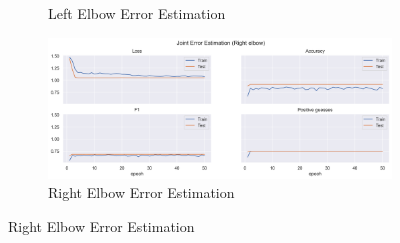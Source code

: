 \begin{figure}[!ht]
\begin{subfigure}[b]{0.47\linewidth}
        \caption{Left Elbow Error Estimation}
        \label{fig:v2_leel_jt_ee}
    \end{subfigure}
    \hfill
    \begin{subfigure}[b]{0.47\linewidth}
        \centering
        \includegraphics[width=\textwidth]{figures/Results/v2/jt/Right elbow_ErrorEstimation.png}
        \caption{Right Elbow Error Estimation}
        \label{fig:v2_reel_jt_ee}
    \end{subfigure}
  \end{figure}
  
